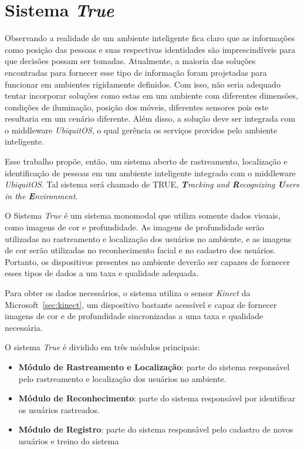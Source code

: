 \chapter{Sistema \textit{True}}

Observando a realidade de um ambiente inteligente fica claro que as informações como posição das pessoas e suas respectivas identidades são imprescindíveis para que decisões possam ser tomadas. Atualmente, a maioria das soluções encontradas para fornecer esse tipo de informação foram projetadas para funcionar em ambientes rigidamente definidos. Com isso, não seria adequado tentar incorporar soluções como estas em um ambiente com diferentes dimensões, condições de iluminação, posição dos móveis, diferentes sensores pois este resultaria em um cenário diferente. Além disso, a solução deve ser integrada com o middleware \textit{UbiquitOS}, o qual gerência os serviços providos pelo ambiente inteligente.

Esse trabalho propõe, então, um sistema aberto de rastreamento, localização e identificação de pessoas em um ambiente inteligente integrado com o middleware \textit{UbiquitOS}. Tal sistema será chamado de TRUE, \textit{\textbf{T}racking and \textbf{R}ecognizing \textbf{U}sers in the \textbf{E}nvironment}.

O Sistema \textit{True} é um sistema monomodal que utiliza somente dados visuais, como imagens de cor e profundidade. As imagens de profundidade serão utilizadas no rastreamento e localização dos usuários no ambiente, e as imagens de cor serão utilizadas no reconhecimento facial e no cadastro dos usuários. Portanto, os dispositivos presentes no ambiente deverão ser capazes de fornecer esses tipos de dados a um taxa e qualidade adequada. 

Para obter os dados necessários, o sistema utiliza o sensor \textit{Kinect} da Microsoft~\ref{sec:kinect}, um dispositivo bastante acessível e capaz de fornecer imagens de cor e de profundidade sincronizadas a uma taxa e qualidade necessária.

O sistema \textit{True} é dividido em três módulos principais:

	\begin{itemize}
		\item \textbf{Módulo de Rastreamento e Localização}: parte do sistema responsável pelo rastreamento e localização dos usuários no ambiente.
		\item \textbf{Módulo de Reconhecimento}: parte do sistema responsável por identificar os usuários rastreados.
		\item \textbf{Módulo de Registro}: parte do sistema responsável pelo cadastro de novos usuários e treino do sistema
	\end{itemize}

